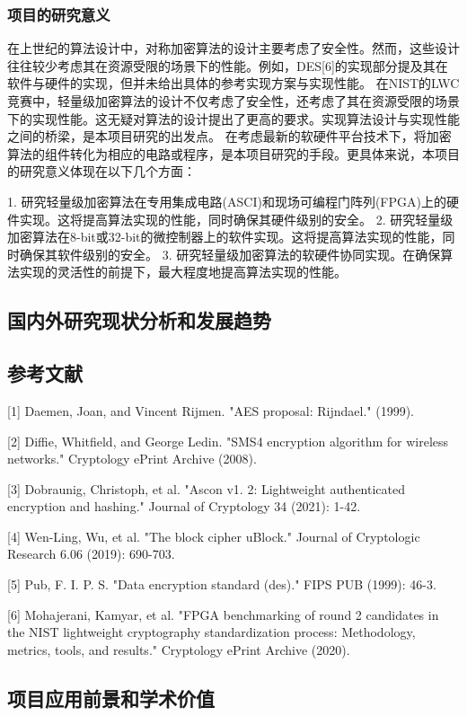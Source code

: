\documentclass{ctexart}
\begin{document}
\subsubsection{项目的研究意义}
在上世纪的算法设计中，对称加密算法的设计主要考虑了安全性。然而，这些设计往往较少考虑其在资源受限的场景下的性能。例如，DES[6]的实现部分提及其在软件与硬件的实现，但并未给出具体的参考实现方案与实现性能。
在NIST的LWC竞赛中，轻量级加密算法的设计不仅考虑了安全性，还考虑了其在资源受限的场景下的实现性能。这无疑对算法的设计提出了更高的要求。实现算法设计与实现性能之间的桥梁，是本项目研究的出发点。
在考虑最新的软硬件平台技术下，将加密算法的组件转化为相应的电路或程序，是本项目研究的手段。更具体来说，本项目的研究意义体现在以下几个方面：

1. 研究轻量级加密算法在专用集成电路(ASCI)和现场可编程门阵列(FPGA)上的硬件实现。这将提高算法实现的性能，同时确保其硬件级别的安全。
2. 研究轻量级加密算法在8-bit或32-bit的微控制器上的软件实现。这将提高算法实现的性能，同时确保其软件级别的安全。
3. 研究轻量级加密算法的软硬件协同实现。在确保算法实现的灵活性的前提下，最大程度地提高算法实现的性能。


\subsection{国内外研究现状分析和发展趋势}

\subsection{参考文献}
[1] Daemen, Joan, and Vincent Rijmen. "AES proposal: Rijndael." (1999).

[2] Diffie, Whitfield, and George Ledin. "SMS4 encryption algorithm for wireless networks." Cryptology ePrint Archive (2008).

[3] Dobraunig, Christoph, et al. "Ascon v1. 2: Lightweight authenticated encryption and hashing." Journal of Cryptology 34 (2021): 1-42.

[4] Wen-Ling, Wu, et al. "The block cipher uBlock." Journal of Cryptologic Research 6.06 (2019): 690-703.

[5] Pub, F. I. P. S. "Data encryption standard (des)." FIPS PUB (1999): 46-3.

[6] Mohajerani, Kamyar, et al. "FPGA benchmarking of round 2 candidates in the NIST lightweight cryptography standardization process: Methodology, metrics, tools, and results." Cryptology ePrint Archive (2020).


\subsection{项目应用前景和学术价值}
\end{document}
